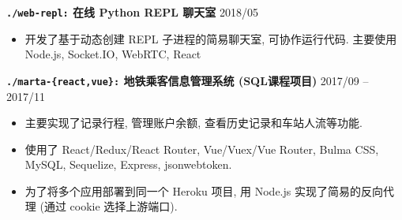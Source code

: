 \documentclass[10 pt]{article}
\begin{document}
\textbf{\texttt{./web-repl:} 在线 Python REPL 聊天室}  \hfill 2018/05 
\begin{itemize}
\item 开发了基于动态创建 REPL 子进程的简易聊天室, 可协作运行代码. 主要使用 Node.js, Socket.IO, WebRTC, React
\end{itemize}

\textbf{\texttt{./marta-\{react,vue\}:} 地铁乘客信息管理系统 (SQL课程项目) } \hfill 2017/09 -- 2017/11
\begin{itemize}
\item 主要实现了记录行程, 管理账户余额, 查看历史记录和车站人流等功能.
\item 使用了 React/Redux/React Router, Vue/Vuex/Vue Router, Bulma  CSS, MySQL, Sequelize, Express, jsonwebtoken.
\item 为了将多个应用部署到同一个 Heroku 项目, 用 Node.js 实现了简易的反向代理 (通过 cookie 选择上游端口).
\end{itemize}
\end{document}
